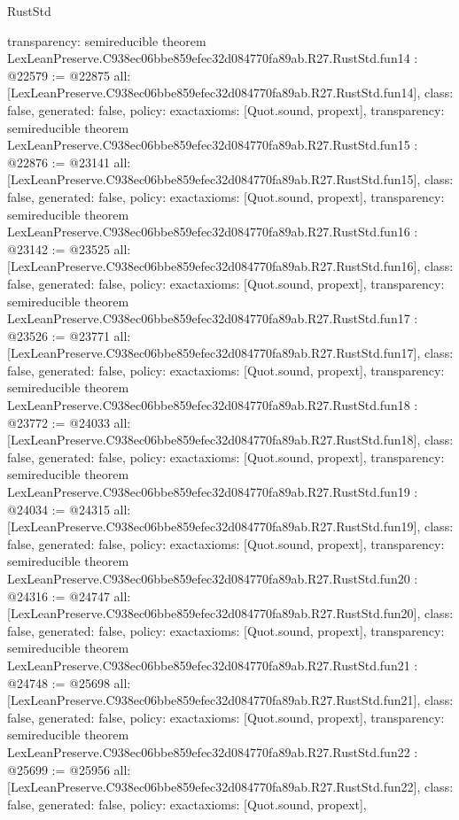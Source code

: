 \begin{lexlean}{RustStd}
\begin{coremodule}
{  transparency: semireducible
}
theorem LexLeanPreserve.C938ec06bbe859efec32d084770fa89ab.R27.RustStd.fun14 : @22579 := @22875 {
  all: [LexLeanPreserve.C938ec06bbe859efec32d084770fa89ab.R27.RustStd.fun14],
  class: false,
  generated: false,
  policy: exact{axioms: [Quot.sound, propext]},
  transparency: semireducible
}
theorem LexLeanPreserve.C938ec06bbe859efec32d084770fa89ab.R27.RustStd.fun15 : @22876 := @23141 {
  all: [LexLeanPreserve.C938ec06bbe859efec32d084770fa89ab.R27.RustStd.fun15],
  class: false,
  generated: false,
  policy: exact{axioms: [Quot.sound, propext]},
  transparency: semireducible
}
theorem LexLeanPreserve.C938ec06bbe859efec32d084770fa89ab.R27.RustStd.fun16 : @23142 := @23525 {
  all: [LexLeanPreserve.C938ec06bbe859efec32d084770fa89ab.R27.RustStd.fun16],
  class: false,
  generated: false,
  policy: exact{axioms: [Quot.sound, propext]},
  transparency: semireducible
}
theorem LexLeanPreserve.C938ec06bbe859efec32d084770fa89ab.R27.RustStd.fun17 : @23526 := @23771 {
  all: [LexLeanPreserve.C938ec06bbe859efec32d084770fa89ab.R27.RustStd.fun17],
  class: false,
  generated: false,
  policy: exact{axioms: [Quot.sound, propext]},
  transparency: semireducible
}
theorem LexLeanPreserve.C938ec06bbe859efec32d084770fa89ab.R27.RustStd.fun18 : @23772 := @24033 {
  all: [LexLeanPreserve.C938ec06bbe859efec32d084770fa89ab.R27.RustStd.fun18],
  class: false,
  generated: false,
  policy: exact{axioms: [Quot.sound, propext]},
  transparency: semireducible
}
theorem LexLeanPreserve.C938ec06bbe859efec32d084770fa89ab.R27.RustStd.fun19 : @24034 := @24315 {
  all: [LexLeanPreserve.C938ec06bbe859efec32d084770fa89ab.R27.RustStd.fun19],
  class: false,
  generated: false,
  policy: exact{axioms: [Quot.sound, propext]},
  transparency: semireducible
}
theorem LexLeanPreserve.C938ec06bbe859efec32d084770fa89ab.R27.RustStd.fun20 : @24316 := @24747 {
  all: [LexLeanPreserve.C938ec06bbe859efec32d084770fa89ab.R27.RustStd.fun20],
  class: false,
  generated: false,
  policy: exact{axioms: [Quot.sound, propext]},
  transparency: semireducible
}
theorem LexLeanPreserve.C938ec06bbe859efec32d084770fa89ab.R27.RustStd.fun21 : @24748 := @25698 {
  all: [LexLeanPreserve.C938ec06bbe859efec32d084770fa89ab.R27.RustStd.fun21],
  class: false,
  generated: false,
  policy: exact{axioms: [Quot.sound, propext]},
  transparency: semireducible
}
theorem LexLeanPreserve.C938ec06bbe859efec32d084770fa89ab.R27.RustStd.fun22 : @25699 := @25956 {
  all: [LexLeanPreserve.C938ec06bbe859efec32d084770fa89ab.R27.RustStd.fun22],
  class: false,
  generated: false,
  policy: exact{axioms: [Quot.sound, propext]},
}
\end{coremodule}
\end{lexlean}
